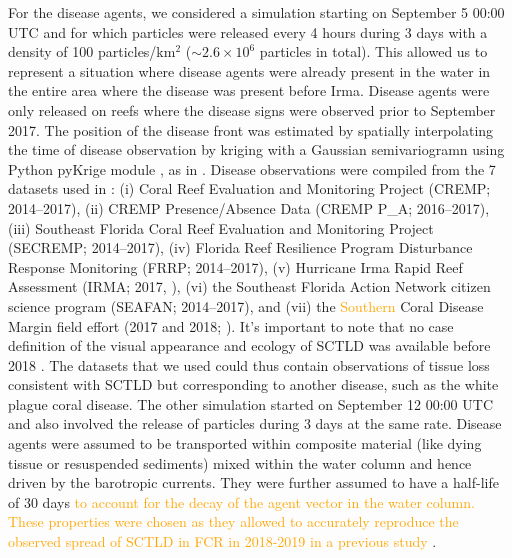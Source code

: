 \documentclass[fleqn,10pt]{wlscirep}
\newcommand{\modif}[1]{\textcolor{orange}{#1}}
\begin{document}
For the disease agents, we considered a simulation starting on September 5 00:00 UTC and for which particles were released every 4 hours during 3 days with a density of 100 particles/km$^2$ ($\sim2.6\times 10^{6}$ particles in total). This allowed us to represent a situation where disease agents were already present in the water in the entire area where the disease was present before Irma. Disease agents were only released on reefs where the disease signs were observed prior to September 2017. The position of the disease front was estimated by spatially interpolating the time of disease observation by kriging with a Gaussian semivariogramn using Python pyKrige module \citep{murphy2014pykrige}, as in \cite{DobbySCTLD}. Disease observations were compiled from the 7 datasets used in \cite{muller2020spatial}: (i) Coral Reef Evaluation and Monitoring Project (CREMP; 2014–2017), (ii) CREMP Presence/Absence Data (CREMP P\_A; 2016–2017), (iii) Southeast Florida Coral Reef Evaluation and Monitoring Project (SECREMP; 2014–2017), (iv) Florida Reef Resilience Program Disturbance Response Monitoring (FRRP; 2014–2017), (v) Hurricane Irma Rapid Reef Assessment (IRMA; 2017, \cite{viehman2018}), (vi) the Southeast Florida Action Network citizen science program (SEAFAN; 2014–2017), and (vii) the \modif{Southern} Coral Disease Margin field effort (2017 and 2018; \cite{neely2018surveying}). It's important to note that no case definition of the visual appearance and ecology of SCTLD was available before 2018 \citep{noaa2018}. The datasets that we used could thus contain observations of tissue loss consistent with SCTLD but corresponding to another disease, such as the white plague coral disease. The other simulation started on September 12 00:00 UTC and also involved the release of particles during 3 days at the same rate. Disease agents were assumed to be transported within composite material (like dying tissue or resuspended sediments) mixed within the water column and hence driven by the barotropic currents. They were further assumed to have a half-life of 30 days \modif{to account for the decay of the agent vector in the water column. These properties were chosen as they allowed to accurately reproduce the observed spread of SCTLD in FCR in 2018-2019 in a previous study} \citep{DobbySCTLD}.
\end{document}
